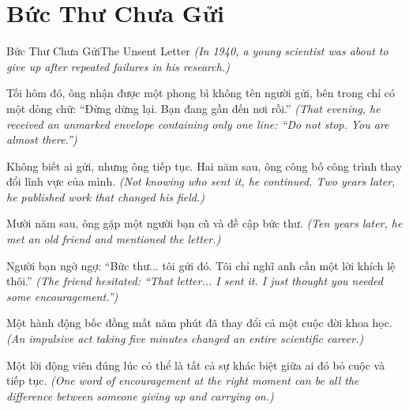 \section{Bức Thư Chưa Gửi}
\begin{truyen}{Bức Thư Chưa Gửi}{The Unsent Letter}
\textit{(In 1940, a young scientist was about to give up after repeated failures in his research.)}

Tối hôm đó, ông nhận được một phong bì không tên người gửi, bên trong chỉ có một dòng chữ: ``Đừng dừng lại. Bạn đang gần đến nơi rồi.''
\textit{(That evening, he received an unmarked envelope containing only one line: ``Do not stop. You are almost there.'')}

Không biết ai gửi, nhưng ông tiếp tục. Hai năm sau, ông công bố công trình thay đổi lĩnh vực của mình.
\textit{(Not knowing who sent it, he continued. Two years later, he published work that changed his field.)}

Mười năm sau, ông gặp một người bạn cũ và đề cập bức thư.
\textit{(Ten years later, he met an old friend and mentioned the letter.)}

Người bạn ngờ ngợ: ``Bức thư... tôi gửi đó. Tôi chỉ nghĩ anh cần một lời khích lệ thôi.''
\textit{(The friend hesitated: ``That letter... I sent it. I just thought you needed some encouragement.'')}

Một hành động bốc đồng mất năm phút đã thay đổi cả một cuộc đời khoa học.
\textit{(An impulsive act taking five minutes changed an entire scientific career.)}

\end{truyen}

\begin{baihoc}
Một lời động viên đúng lúc có thể là tất cả sự khác biệt giữa ai đó bỏ cuộc và tiếp tục.
\textit{(One word of encouragement at the right moment can be all the difference between someone giving up and carrying on.)}
\end{baihoc}
\ngancach

